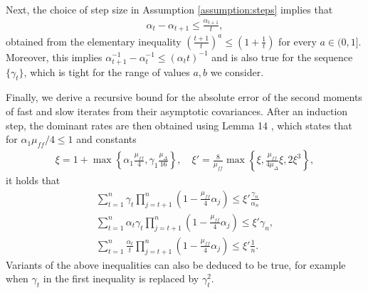 

Next, the choice of step size in Assumption \ref{assumption:steps} implies that
\begin{align*}
    \alpha_t - \alpha_{t+1} \leq \frac{\alpha_{t+1}}{t} ,
\end{align*}
obtained from the elementary inequality $(\frac{t+1}{t})^a \leq (1+\frac{1}{t})$ for every $a \in (0, 1]$. 
Moreover, this implies $\alpha_{t+1}^{-1} - \alpha_t^{-1} \leq (\alpha_{t} t)^{-1}$ and is also true for the sequence $\{\gamma_t\}$, which is tight for the range of values $a, b$ we consider. 

Finally, we derive a recursive bound for the absolute error of the second moments of fast and slow iterates from their asymptotic covariances.
After an induction step, the dominant rates are then obtained using Lemma 14 \citep{kaledin2020finite}, which states that for $\alpha_1 \mu_{ff}/4 \leq 1$ and constants
\begin{align*}
    \xi = 1 + \max \left\{\alpha_1 \frac{\mu_{ff}}{4}, \gamma_1 \frac{\mu_\Delta}{16} \right\},
    \quad 
    \xi' = \frac{8}{\mu_{ff}}\max \left\{\xi, \frac{\mu_{ff}}{4\mu_{\Delta}} \xi, 2 \xi^3
        \right\},
\end{align*}
it holds that
\begin{equation}
    \begin{split}
        \sum_{t=1}^n \gamma_t \prod_{j=t+1}^n \left(1 - \frac{\mu_{ff}}{4} \alpha_j\right) 
        \leq \xi' \frac{\gamma_{n}}{\alpha_n}
        \\
        \sum_{t=1}^n \alpha_t \gamma_t \prod_{j=t+1}^n \left(1 - \frac{\mu_{ff}}{4} \alpha_j\right) 
        \leq \xi' \gamma_{n}
        ,
        \\
        \sum_{t=1}^n \frac{\alpha_t}{t} \prod_{j=t+1}^n \left(1 - \frac{\mu_{ff}}{4} \alpha_j \right) 
        \leq 
        \xi' \frac{1}{n} .
    \end{split} 
    \label{eq:induction_size_equation}
\end{equation}
Variants of the above inequalities can also be deduced to be true, for example when $\gamma_t$ in the first inequality is replaced by $\gamma_t^2$. 


